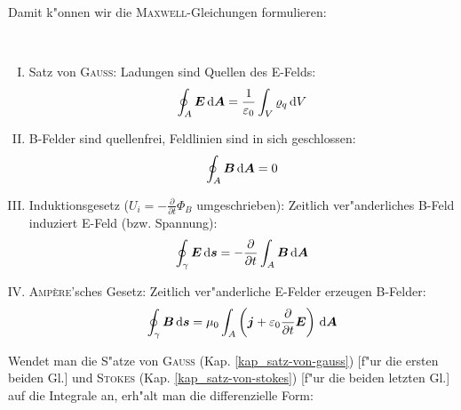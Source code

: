 Damit k"onnen wir die \textsc{Maxwell}-Gleichungen formulieren:


\clearpage

\begin{Wichtig}~\\
   \begin{enumerate}[(I)]
   \item Satz von \textsc{Gauss}: Ladungen sind Quellen des E-Felds:
\begin{equation}
   \label{eqn_max1_int}
   \oint_A \boldsymbol{E} \, \mathrm{d} \boldsymbol{A} = \frac{1}{\varepsilon_0} \int_V
   \varrho_q \, \mathrm{d} V
\end{equation}
\item B-Felder sind quellenfrei, Feldlinien sind in sich geschlossen:
   \begin{equation}
      \label{eqn_max2_int}
      \oint_A \boldsymbol{B} \, \mathrm{d} \boldsymbol{A} = 0
   \end{equation}
\item Induktionsgesetz ($U_i = -\frac{\partial }{\partial
     t}\Phi_B$ umgeschrieben): Zeitlich ver"anderliches B-Feld induziert E-Feld
   (bzw. Spannung):
   \begin{equation}
      \label{eqn_max3-int}
      \oint_\gamma \boldsymbol{E} \, \mathrm{d} \boldsymbol{s} = -\frac{\partial }{\partial t}
      \int_A \boldsymbol{B} \, \mathrm{d} \boldsymbol{A}
   \end{equation}

\item \textsc{Amp\`ere}'sches Gesetz: Zeitlich ver"anderliche E-Felder
   erzeugen B-Felder:
   \begin{equation}
      \label{eqn_max4-int}
      \oint_\gamma \boldsymbol{B} \, \mathrm{d} \boldsymbol{s} = \mu_0 \int_A \left(\boldsymbol{j} +
      \varepsilon_0\frac{\partial }{\partial t}\boldsymbol{E}\right) \, \mathrm{d} \boldsymbol{A}
   \end{equation}
   \end{enumerate}
\end{Wichtig}

Wendet man die S"atze von \textsc{Gauss}
(Kap. \ref{kap_satz-von-gauss}) [f"ur die ersten beiden Gl.] und \textsc{Stokes}
(Kap. \ref{kap_satz-von-stokes})  [f"ur die beiden letzten Gl.] auf die Integrale an, erh"alt man die
differenzielle Form:

